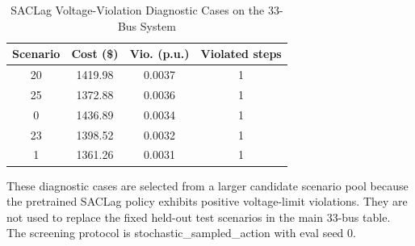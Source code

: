 \begin{table}[!t]
\caption{SACLag Voltage-Violation Diagnostic Cases on the 33-Bus System}
\label{tab:saclag_violation_stress_33}
\centering
\scriptsize
\setlength{\tabcolsep}{4.2pt}
\begin{tabular}{cccc}
\toprule
Scenario & Cost (\$) & Vio. (p.u.) & Violated steps \\
\midrule
20 & 1419.98 & 0.0037 & 1 \\
25 & 1372.88 & 0.0036 & 1 \\
0 & 1436.89 & 0.0034 & 1 \\
23 & 1398.52 & 0.0032 & 1 \\
1 & 1361.26 & 0.0031 & 1 \\
\bottomrule
\end{tabular}
\vspace{0.5mm}
\parbox{0.98\linewidth}{\footnotesize
These diagnostic cases are selected from a larger candidate scenario pool because the pretrained SACLag policy exhibits positive voltage-limit violations. They are not used to replace the fixed held-out test scenarios in the main 33-bus table. The screening protocol is stochastic_sampled_action with eval seed 0.
}
\end{table}
